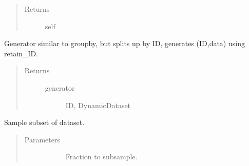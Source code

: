 \documentclass[letterpaper,10pt,english]{sphinxmanual}
\begin{document}
\begin{fulllineitems}
\begin{fulllineitems}
\begin{quote}
\begin{description}
\begin{description}
\end{description}

\item[{Returns}] \leavevmode\begin{description}
\item[{self}] \leavevmode
\end{description}

\end{description}\end{quote}

\end{fulllineitems}


\begin{fulllineitems}
\label{\detokenize{index:pathflowai.datasets.DynamicImageDataset.split_by_ID}}
Generator similar to groupby, but splits up by ID, generates (ID,data) using retain\_ID.
\begin{quote}\begin{description}
\item[{Returns}] \leavevmode\begin{description}
\item[{generator}] \leavevmode
ID, DynamicDataset

\end{description}

\end{description}\end{quote}

\end{fulllineitems}


\begin{fulllineitems}
\label{\detokenize{index:pathflowai.datasets.DynamicImageDataset.subsample}}
Sample subset of dataset.
\begin{quote}\begin{description}
\item[{Parameters}] \leavevmode\begin{description}
\item[{}] \leavevmode
Fraction to subsample.

\end{description}

\end{description}\end{quote}

\end{fulllineitems}


\end{fulllineitems}
\end{document}
